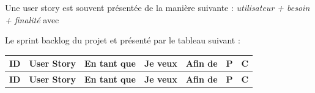 Une user story est souvent présentée de la manière suivante :
\og{}\textit{utilisateur + besoin + finalité}\fg{} avec

Le sprint backlog du projet et présenté par le tableau suivant :

  

\renewcommand{\arraystretch}{1.5}
\begin{center}
\begin{longtable}{|>{\centering\arraybackslash}m{0.5cm}|
    >{\centering\arraybackslash}m{3cm}|
    >{\centering\arraybackslash}m{2.5cm}|
    >{\centering\arraybackslash}m{2.5cm}|
    >{\centering\arraybackslash}m{3cm}|
    >{\centering\arraybackslash}m{0.5cm}|
    >{\centering\arraybackslash}m{0.5cm}|}
\hline
\textbf{ID} & \textbf{User Story} & \textbf{En tant que} & \textbf{Je veux} &
\textbf{Afin de} & \textbf{P} & \textbf{C} \\
\hline
\endfirsthead
\hline
\textbf{ID} & \textbf{User Story} & \textbf{En tant que} & \textbf{Je veux} &
\textbf{Afin de} & \textbf{P} & \textbf{C} \\
\hline
\endhead


\end{longtable}
\end{center}
